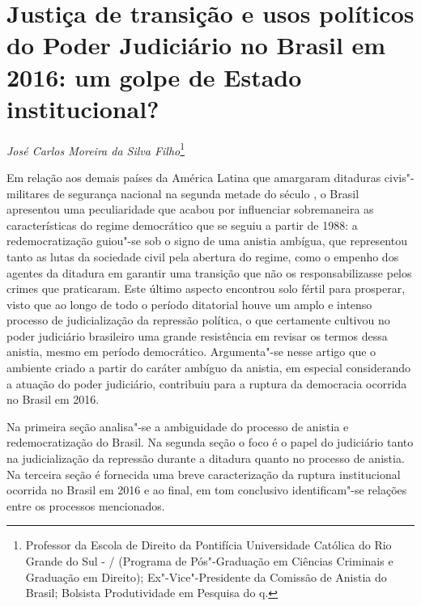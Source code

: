\chapter*{Justiça de transição e usos políticos do Poder Judiciário
no Brasil em 2016: um golpe de Estado institucional?}


\begin{flushright}
\emph{José Carlos Moreira da Silva Filho}\footnote{Professor da Escola
  de Direito da Pontifícia Universidade Católica do Rio Grande do Sul -
  / (Programa de Pós"-Graduação em Ciências Criminais e Graduação em
  Direito); Ex"-Vice"-Presidente da Comissão de Anistia do Brasil;
  Bolsista Produtividade em Pesquisa do q.}
\end{flushright}

Em relação aos demais países da América Latina que amargaram ditaduras
civis"-militares de segurança nacional na segunda metade do século , o
Brasil apresentou uma peculiaridade que acabou por influenciar
sobremaneira as características do regime democrático que se seguiu a
partir de 1988: a redemocratização guiou"-se sob o signo de uma anistia
ambígua, que representou tanto as lutas da sociedade civil pela abertura
do regime, como o empenho dos agentes da ditadura em garantir uma
transição que não os responsabilizasse pelos crimes que praticaram. Este
último aspecto encontrou solo fértil para prosperar, visto que ao longo
de todo o período ditatorial houve um amplo e intenso processo de
judicialização da repressão política, o que certamente cultivou no poder
judiciário brasileiro uma grande resistência em revisar os termos dessa
anistia, mesmo em período democrático. Argumenta"-se nesse artigo que o
ambiente criado a partir do caráter ambíguo da anistia, em especial
considerando a atuação do poder judiciário, contribuiu para a ruptura da
democracia ocorrida no Brasil em 2016.

Na primeira seção analisa"-se a ambiguidade do processo de anistia e
redemocratização do Brasil. Na segunda seção o foco é o papel do
judiciário tanto na judicialização da repressão durante a ditadura
quanto no processo de anistia. Na terceira seção é fornecida uma breve
caracterização da ruptura institucional ocorrida no Brasil em 2016 e ao
final, em tom conclusivo identificam"-se relações entre os processos
mencionados.


